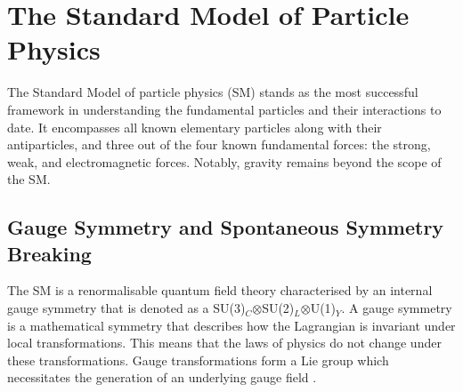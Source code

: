 \documentclass[bachelor,ngerman,english]{GAUBM}
\begin{document}






\chapter{The Standard Model of Particle Physics}
\label{ch:standard_model}
The Standard Model of particle physics (SM) \cite{theory:general_sm} stands as the most successful framework in understanding the fundamental particles and their interactions to date. It encompasses all known elementary particles along with their antiparticles, and three out of the four known fundamental forces: the strong, weak, and electromagnetic forces. Notably, gravity remains beyond the scope of the SM.


\section{Gauge Symmetry and Spontaneous Symmetry Breaking}
\label{sec:theory:gauge_symmetry_and_higgs_meachanism}
The SM is a renormalisable quantum field theory \cite{theory:quantum_fields} characterised by an internal gauge symmetry that is denoted as a SU(3)$_C$$\otimes$SU(2)$_L$$\otimes$U(1)$_Y$. A gauge symmetry is a mathematical symmetry that describes how the Lagrangian is invariant under local transformations. This means that the laws of physics do not change under these transformations. Gauge transformations form a Lie group \cite{theory:lie_groups} which necessitates the generation of an underlying gauge field \cite{theory:gauge_fields}.
\end{document}
